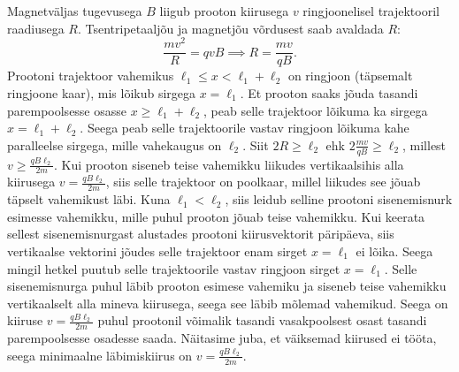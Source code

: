 \solu
Magnetväljas tugevusega $B$ liigub prooton kiirusega $v$ ringjoonelisel trajektooril raadiusega $R$. Tsentripetaaljõu ja magnetjõu võrdusest saab avaldada $R$:
\[\frac{mv^2}{R}=qvB\implies R=\frac{mv}{qB}.\]
Prootoni trajektoor vahemikus $\ell_1\leq x < \ell_1+\ell_2$ on ringjoon (täpsemalt ringjoone kaar), mis lõikub sirgega $x=\ell_1$. Et prooton saaks jõuda tasandi parempoolsesse osasse $x\geq \ell_1+\ell_2$, peab selle trajektoor lõikuma ka sirgega $x=\ell_1+\ell_2$. Seega peab selle trajektoorile vastav ringjoon lõikuma kahe paralleelse sirgega, mille vahekaugus on $\ell_2$. Siit $2R \geq \ell_2$ ehk $2\frac{mv}{qB}\geq \ell_2$, millest $v\geq \frac{qB\ell_2}{2m}$. Kui prooton siseneb teise vahemikku liikudes vertikaalsihis alla kiirusega $v= \frac{qB\ell_2}{2m}$, siis selle trajektoor on poolkaar, millel liikudes see jõuab täpselt vahemikust läbi. Kuna $\ell_1<\ell_2$, siis leidub selline prootoni sisenemisnurk esimesse vahemikku, mille puhul prooton jõuab teise vahemikku. Kui keerata sellest sisenemisnurgast alustades prootoni kiirusvektorit päripäeva, siis vertikaalse vektorini jõudes selle trajektoor enam sirget $x=\ell_1$ ei lõika. Seega mingil hetkel puutub selle trajektoorile vastav ringjoon sirget $x=\ell_1$. Selle sisenemisnurga puhul läbib prooton esimese vahemiku ja siseneb teise vahemikku vertikaalselt alla mineva kiirusega, seega see läbib mõlemad vahemikud. Seega on kiiruse $v=\frac{qB\ell_2}{2m}$ puhul prootonil võimalik tasandi vasakpoolsest osast tasandi parempoolsesse osadesse saada. Näitasime juba, et väiksemad kiirused ei tööta, seega minimaalne läbimiskiirus on $v=\frac{qB\ell_2}{2m}$.

